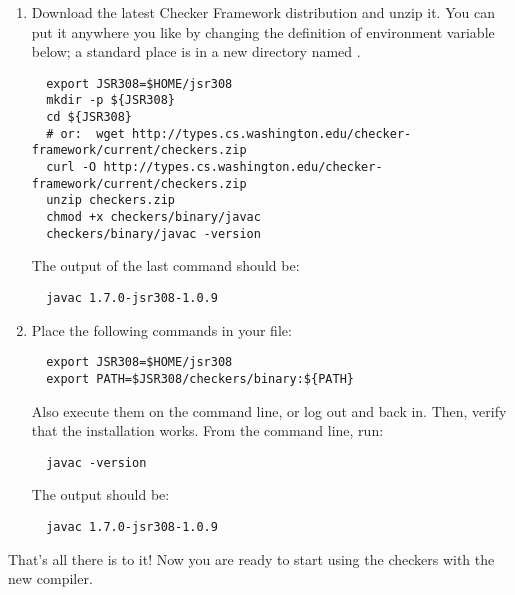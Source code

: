 \begin{enumerate}

\item
  Download the latest Checker Framework distribution
  and unzip it.  You can put it anywhere you like by changing the
  definition of environment variable  below; a standard place
  is in a
  new directory named .

\begin{Verbatim}
  export JSR308=$HOME/jsr308
  mkdir -p ${JSR308}
  cd ${JSR308}
  # or:  wget http://types.cs.washington.edu/checker-framework/current/checkers.zip
  curl -O http://types.cs.washington.edu/checker-framework/current/checkers.zip
  unzip checkers.zip
  chmod +x checkers/binary/javac
  checkers/binary/javac -version
\end{Verbatim}

The output of the last command should be:

\begin{Verbatim}
  javac 1.7.0-jsr308-1.0.9
\end{Verbatim}


\item
  Place the following commands in your  file:
\begin{Verbatim}
  export JSR308=$HOME/jsr308
  export PATH=$JSR308/checkers/binary:${PATH}
\end{Verbatim}


Also execute them on the command line, or log out and back in.  Then,
verify that the installation works.  From the command line, run:

\begin{Verbatim}
  javac -version
\end{Verbatim}

The output should be:

\begin{Verbatim}
  javac 1.7.0-jsr308-1.0.9
\end{Verbatim}

\end{enumerate}

That's all there is to it!  Now you are ready to start using the checkers with
the new  compiler.

